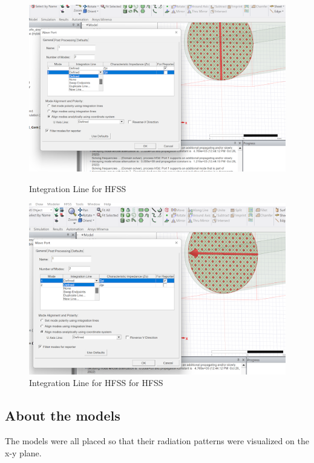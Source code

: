 \documentclass[a4paper,12pt]{report}
\begin{document}
\begin{figure}
  \centering
  \begin{minipage}{0.45\textwidth}
    \centering
    \includegraphics[clip, keepaspectratio, width=0.9\linewidth]{img/hfss_mode_integration_line_1.png}
    \caption{Integration Line for HFSS}
    \label{fig:hfss_mode_integration_line_1}
  \end{minipage}\hfill
  \begin{minipage}{0.45\textwidth}
    \centering
    \includegraphics[clip, keepaspectratio, width=0.9\linewidth]{img/hfss_mode_integration_line_2.png}
    \caption{Integration Line for HFSS for HFSS}
    \label{fig:hfss_mode_integration_line_2}
  \end{minipage}\hfill
\end{figure}

\subsection{About the models}

The models were all placed so that their radiation patterns
were visualized on the x-y plane.

\newpage
{}

\end{document}
